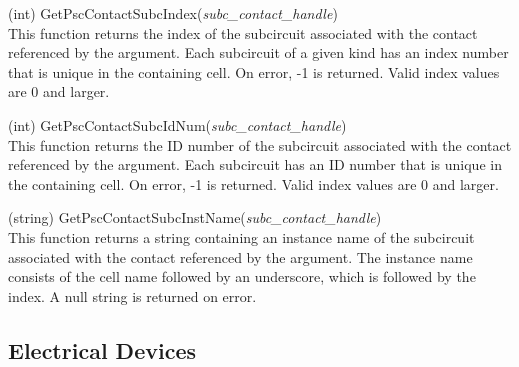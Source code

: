 \begin{description}
\item{(int) \vt GetPscContactSubcIndex({\it subc\_contact\_handle\/})}\\
This function returns the index of the subcircuit associated with the
contact referenced by the argument.  Each subcircuit of a given kind
has an index number that is unique in the containing cell.  On error,
-1 is returned.  Valid index values are 0 and larger.

\item{(int) \vt GetPscContactSubcIdNum({\it subc\_contact\_handle\/})}\\
This function returns the ID number of the subcircuit associated with
the contact referenced by the argument.  Each subcircuit has an ID
number that is unique in the containing cell.  On error, -1 is
returned.  Valid index values are 0 and larger.

\item{(string) \vt GetPscContactSubcInstName({\it subc\_contact\_handle\/})}\\
This function returns a string containing an instance name of the
subcircuit associated with the contact referenced by the argument. 
The instance name consists of the cell name followed by an underscore,
which is followed by the index.  A null string is returned on error.

\end{description}


\subsection{Electrical Devices}

